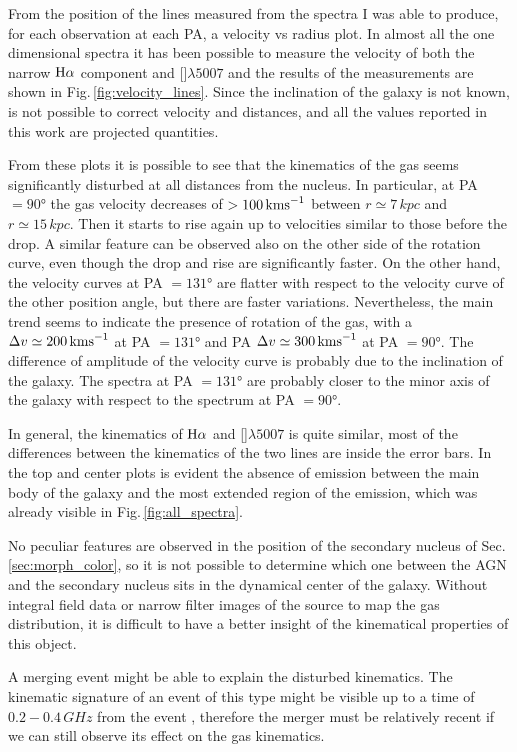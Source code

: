 \documentclass[../main.tex]{subfiles}
\begin{document}
From the position of the lines measured from the spectra I was able to produce, for each observation at each PA, a velocity vs radius plot.
In almost all the one dimensional spectra it has been possible to measure the velocity of both the narrow $\Ha$ component and []$\lambda5007$ and the results of the measurements are shown in Fig.\,\ref{fig:velocity_lines}.
Since the inclination of the galaxy is not known, is not possible to correct velocity and distances, and all the values reported in this work are projected quantities.

From these plots it is possible to see that the kinematics of the gas seems significantly disturbed at all distances from the nucleus.
In particular, at PA $=\ang{90}$ the gas velocity decreases of $>100\,\si{\kms}$ between $r\simeq 7\,\si{kpc}$
and $r\simeq 15\,\si{kpc}$.
Then it starts to rise again up to velocities similar to those before the drop.
A similar feature can be observed also on the other side of the rotation curve, even though the drop and rise are significantly faster.
On the other hand, the velocity curves at PA $=\ang{131}$ are flatter with respect to the velocity curve of the other position angle, but there are faster variations.
Nevertheless, the main trend seems to indicate the presence of rotation of the gas, with a $\Delta v \simeq 200\,\si{\kms}$ at PA $=\ang{131}$ and PA $\Delta v \simeq 300\,\si{\kms}$ at PA $=\ang{90}$.
The difference of amplitude of the velocity curve is probably due to the inclination of the galaxy.
The spectra at PA $=\ang{131}$ are probably closer to the minor axis of the galaxy with respect to the spectrum at PA $=\ang{90}$.

In general, the kinematics of $\Ha$ and []$\lambda5007$ is quite similar, most of the differences between the kinematics of the two lines are inside the error bars.
In the top and center plots is evident the absence of emission between the main body of the galaxy and the most extended region of the emission, which was already visible in Fig.\,\ref{fig:all_spectra}.

No peculiar features are observed in the position of the secondary nucleus of Sec.\,\ref{sec:morph_color}, so it is not possible to determine which one between the AGN and the secondary nucleus sits in the dynamical center of the galaxy.
Without integral field data or narrow filter images of the source to map the gas distribution, it is difficult to have a better insight of the kinematical properties of this object.

A merging event might be able to explain the disturbed kinematics.
The kinematic signature of an event of this type might be visible up to a time of $0.2-0.4\,\si{GHz}$ from the event \citep{Hung16}, therefore the merger must be relatively recent if we can still observe its effect on the gas kinematics.
\end{document}
